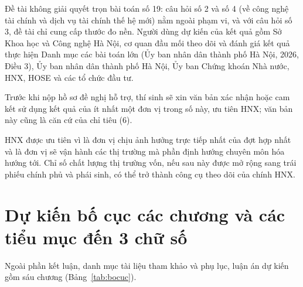 Đề tài không giải quyết trọn bài toán số 19: câu hỏi số 2 và số 4 (về công nghệ tài chính và dịch vụ tài chính thế hệ mới) nằm ngoài phạm vi, và với câu hỏi số 3, đề tài chỉ cung cấp thước đo nền. Người dùng dự kiến của kết quả gồm Sở Khoa học và Công nghệ Hà Nội, cơ quan đầu mối theo dõi và đánh giá kết quả thực hiện Danh mục các bài toán lớn (Ủy ban nhân dân thành phố Hà Nội, 2026, Điều 3), Ủy ban nhân dân thành phố Hà Nội, Ủy ban Chứng khoán Nhà nước, HNX, HOSE và các tổ chức đầu tư.

Trước khi nộp hồ sơ đề nghị hỗ trợ, thí sinh sẽ xin văn bản xác nhận hoặc cam kết sử dụng kết quả của ít nhất một đơn vị trong số này, ưu tiên HNX; văn bản này cũng là căn cứ của chỉ tiêu (6).

HNX được ưu tiên vì là đơn vị chịu ảnh hưởng trực tiếp nhất của đợt hợp nhất và là đơn vị sẽ vận hành các thị trường mà phần định hướng chuyên môn hóa hướng tới. Chỉ số chất lượng thị trường vốn, nếu sau này được mở rộng sang trái phiếu chính phủ và phái sinh, có thể trở thành công cụ theo dõi của chính HNX.

\section{Dự kiến bố cục các chương và các tiểu mục đến 3 chữ số}\label{sec:bocuc}

Ngoài phần kết luận, danh mục tài liệu tham khảo và phụ lục, luận án dự kiến gồm sáu chương (Bảng~\ref{tab:bocuc}).

